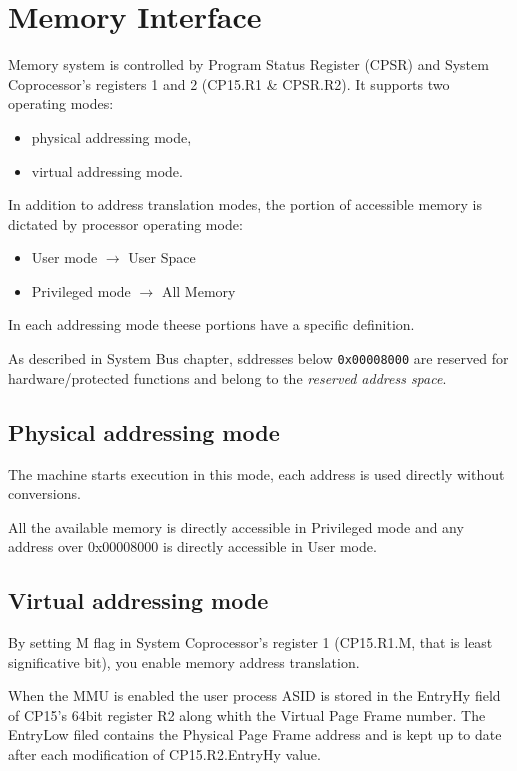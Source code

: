 \chapter{Memory Interface}
Memory system is controlled by Program Status Register (CPSR) and System Coprocessor's registers 1 and 2 (CP15.R1 \& CPSR.R2). It supports two operating modes:

\begin{itemize}
\item physical addressing mode, 
\item virtual addressing mode.
\end{itemize}

In addition to address translation modes, the portion of accessible memory is dictated by processor operating mode:

\begin{itemize}
\item User mode $\rightarrow$ User Space
\item Privileged mode $\rightarrow$ All Memory
\end{itemize}

In each addressing mode theese portions have a specific definition.

As described in System Bus chapter, sddresses below \texttt{0x00008000} are reserved for hardware/protected functions and belong to the \emph{reserved address space}.

\section{Physical addressing mode}
The machine starts execution in this mode, each address is used directly without conversions.

All the available memory is directly accessible in Privileged mode and any address over 0x00008000 is directly accessible in User mode.

\section{Virtual addressing mode}
By setting M flag in System Coprocessor's register 1 (CP15.R1.M, that is least significative bit), you enable memory address translation.

When the MMU is enabled the user process ASID is stored in the EntryHy field of CP15's 64bit register R2 along whith the Virtual Page Frame number. The EntryLow filed contains the Physical Page Frame address and is kept up to date after each modification of CP15.R2.EntryHy value.

